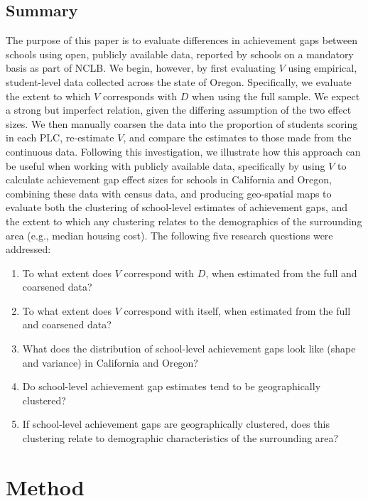 \documentclass[man, fleqn, noextraspace]{apa6}
\providecommand{\tightlist}{%
  \setlength{\itemsep}{0pt}\setlength{\parskip}{0pt}}
\theoremstyle{definition}
\theoremstyle{definition}
\theoremstyle{definition}
\theoremstyle{remark}
\begin{document}
\hypertarget{summary}{%
\subsection{Summary}\label{summary}}

The purpose of this paper is to evaluate differences in achievement gaps
between schools using open, publicly available data, reported by schools
on a mandatory basis as part of NCLB. We begin, however, by first
evaluating \(V\) using empirical, student-level data collected across
the state of Oregon. Specifically, we evaluate the extent to which \(V\)
corresponds with \(D\) when using the full sample. We expect a strong
but imperfect relation, given the differing assumption of the two effect
sizes. We then manually coarsen the data into the proportion of students
scoring in each PLC, re-estimate \(V\), and compare the estimates to
those made from the continuous data. Following this investigation, we
illustrate how this approach can be useful when working with publicly
available data, specifically by using \(V\) to calculate achievement gap
effect sizes for schools in California and Oregon, combining these data
with census data, and producing geo-spatial maps to evaluate both the
clustering of school-level estimates of achievement gaps, and the extent
to which any clustering relates to the demographics of the surrounding
area (e.g., median housing cost). The following five research questions
were addressed:

\begin{enumerate}
\def\labelenumi{\arabic{enumi}.}
\tightlist
\item
  To what extent does \(V\) correspond with \(D\), when estimated from
  the full and coarsened data?
\item
  To what extent does \(V\) correspond with itself, when estimated from
  the full and coarsened data?
\item
  What does the distribution of school-level achievement gaps look like
  (shape and variance) in California and Oregon?
\item
  Do school-level achievement gap estimates tend to be geographically
  clustered?
\item
  If school-level achievement gaps are geographically clustered, does
  this clustering relate to demographic characteristics of the
  surrounding area?
\end{enumerate}

\hypertarget{method}{%
\section{Method}\label{method}}
\end{document}
